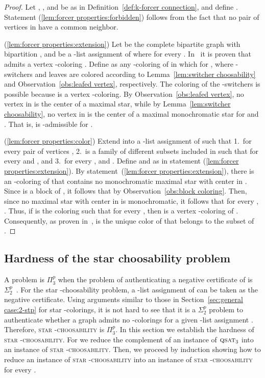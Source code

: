 \documentclass[a4paper, 11pt, oneside]{article}
\newcommand{\stchose}[1]{\textsc{star -choosability}}
\newcommand{\stp}{\ensuremath{\Sigma^p_2}\xspace}
\newcommand{\ptp}{\ensuremath{\Pi^p_3}\xspace}
\newcommand{\qsat}[1]{\ensuremath{\textsc{qsat}_{#1}}}
\begin{document}
\begin{proof}
 Let , , and  be as in Definition~\ref{def:k-forcer connection}, and define .  Statement (\ref{lem:forcer properties:forbidden}) follows from the fact that no pair of vertices in  have a common neighbor.
 
 (\ref{lem:forcer properties:extension}) Let  be the complete bipartite graph with bipartition , and  be a -list assignment of  where  for every .  In~\cite{MarxTCS2011} it is proven that  admits a vertex -coloring .  Define  as any -coloring of  in which  for , where -switchers and leaves are colored according to Lemma~\ref{lem:switcher choosability} and Observation~\ref{obs:leafed vertex}, respectively.  The coloring of the -switchers is possible because  is a vertex -coloring.  By Observation~\ref{obs:leafed vertex}, no vertex in  is the center of a maximal star, while by Lemma~\ref{lem:switcher choosability}, no vertex in  is the center of a maximal monochromatic star for  and .  That is,  is -admissible for .
 
 (\ref{lem:forcer properties:color})  Extend  into a -list assignment of  such that 1.\  for every pair of vertices , 2.\  is a family of different subsets included in  such that  for every  and , and 3.\  for every , and .  Define  and  as in statement (\ref{lem:forcer properties:extension}).  By statement~(\ref{lem:forcer properties:extension}), there is an -coloring  of  that contains no monochromatic maximal star with center in .  Since  is a block of , it follows that  by Observation~\ref{obs:block coloring}.  Then, since no maximal star with center in  is monochromatic, it follows that  for every , .  Thus, if  is the coloring such that  for every , then  is a vertex -coloring of .  Consequently, as proven in~\cite{MarxTCS2011},  is the unique color of  that belongs to the subset of .
 \end{proof}

\subsection{Hardness of the star choosability problem}

A problem  is \ptp when the problem of authenticating a negative certificate of  is \stp~\cite{Papadimitriou1994}.  For the star -choosability problem, a -list assignment of  can be taken as the negative certificate.  Using arguments similar to those in Section~\ref{sec:general case:2-stp} for star -colorings, it is not hard to see that it is a \stp problem to authenticate whether a graph  admits no -colorings for a given -list assignment .  Therefore, \stchose{k} is \ptp.  In this section we establish the hardness of \stchose{k}.  For  we reduce the complement of an instance of \qsat{3} into an instance of \stchose{2}.  Then, we proceed by induction showing how to reduce an instance of \stchose{k} into an instance of \stchose{(k+1)} for every .  
\end{document}
